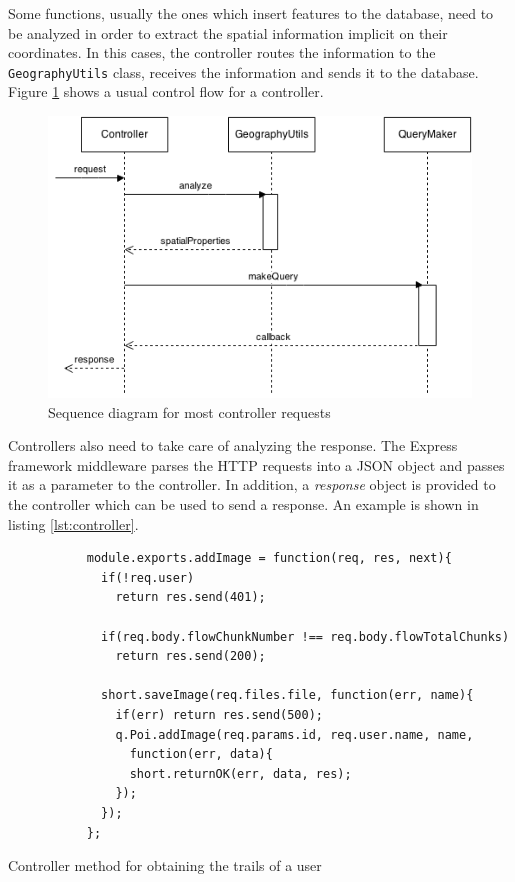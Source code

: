 Some functions, usually the ones which insert features to the database, need to be analyzed in order to extract the spatial information implicit on their coordinates. In this cases, the controller routes the information to the \texttt{GeographyUtils} class, receives the information and sends it to the database. Figure \ref{fig:controller-sequence} shows a usual control flow for a controller.

\begin{figure}[ht]
  \centering
  \includegraphics[width=.7\textwidth]{fig/controller-sequence}
  \caption{Sequence diagram for most controller requests}
  \label{fig:controller-sequence}
\end{figure} 

Controllers also need to take care of analyzing the response. The Express framework middleware parses the HTTP requests into a JSON object and passes it as a parameter to the controller. In addition, a \textit{response} object is provided to the controller which can be used to send a response. An example is shown in listing \ref{lst:controller}.

\begin{listing}[ht]\centering
  \begin{minipage}{.85\textwidth}
    \begin{verbatim}
           module.exports.addImage = function(req, res, next){
             if(!req.user)
               return res.send(401);
             
             if(req.body.flowChunkNumber !== req.body.flowTotalChunks)
               return res.send(200); 
               
             short.saveImage(req.files.file, function(err, name){
               if(err) return res.send(500);
               q.Poi.addImage(req.params.id, req.user.name, name, 
                 function(err, data){
                 short.returnOK(err, data, res);
               });
             });
           };
    \end{verbatim}
  \end{minipage}
  \caption{Controller method for obtaining the trails of a user}\label{lst:controller}
\end{listing}


